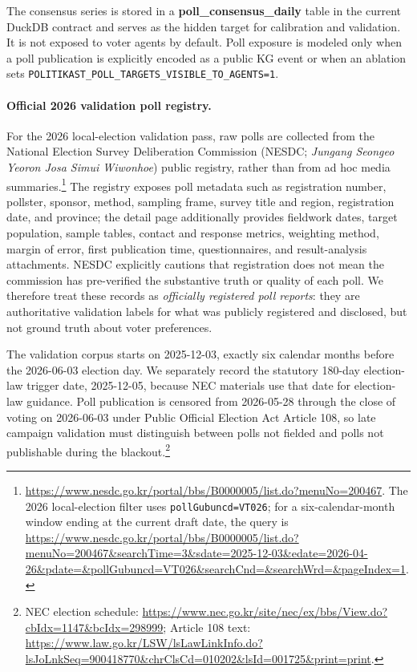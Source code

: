 \documentclass[11pt]{article}
\begin{document}
The consensus series is stored in a \textbf{poll\_consensus\_daily} table in the current DuckDB contract and serves as the hidden target for calibration and validation. It is not exposed to voter agents by default. Poll exposure is modeled only when a poll publication is explicitly encoded as a public KG event or when an ablation sets \texttt{POLITIKAST\_POLL\_TARGETS\_VISIBLE\_TO\_AGENTS=1}.

\paragraph{Official 2026 validation poll registry.}
For the 2026 local-election validation pass, raw polls are collected from the National Election Survey Deliberation Commission (NESDC; \emph{Jungang Seongeo Yeoron Josa Simui Wiwonhoe}) public registry, rather than from ad hoc media summaries.\footnote{\url{https://www.nesdc.go.kr/portal/bbs/B0000005/list.do?menuNo=200467}. The 2026 local-election filter uses \texttt{pollGubuncd=VT026}; for a six-calendar-month window ending at the current draft date, the query is \url{https://www.nesdc.go.kr/portal/bbs/B0000005/list.do?menuNo=200467&searchTime=3&sdate=2025-12-03&edate=2026-04-26&pdate=&pollGubuncd=VT026&searchCnd=&searchWrd=&pageIndex=1}.} The registry exposes poll metadata such as registration number, pollster, sponsor, method, sampling frame, survey title and region, registration date, and province; the detail page additionally provides fieldwork dates, target population, sample tables, contact and response metrics, weighting method, margin of error, first publication time, questionnaires, and result-analysis attachments. NESDC explicitly cautions that registration does not mean the commission has pre-verified the substantive truth or quality of each poll. We therefore treat these records as \emph{officially registered poll reports}: they are authoritative validation labels for what was publicly registered and disclosed, but not ground truth about voter preferences.

The validation corpus starts on 2025-12-03, exactly six calendar months before the 2026-06-03 election day. We separately record the statutory 180-day election-law trigger date, 2025-12-05, because NEC materials use that date for election-law guidance. Poll publication is censored from 2026-05-28 through the close of voting on 2026-06-03 under Public Official Election Act Article 108, so late campaign validation must distinguish between polls not fielded and polls not publishable during the blackout.\footnote{NEC election schedule: \url{https://www.nec.go.kr/site/nec/ex/bbs/View.do?cbIdx=1147&bcIdx=298999}; Article 108 text: \url{https://www.law.go.kr/LSW/lsLawLinkInfo.do?lsJoLnkSeq=900418770&chrClsCd=010202&lsId=001725&print=print}.}
\end{document}
